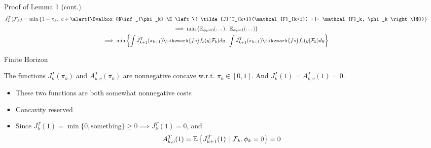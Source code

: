 \documentclass[xcolor={svgnames}]{beamer}
\begin{document}
\begin{frame}{Proof of Lemma 1 (cont.)}
\[
  \begin{gathered}
  \tilde{J}^T_{k}(\mathcal{F}_k) = \min\left\{
  1 - \pi_k,
  ~c + \alert{\Ovalbox{$\inf_{\phi_k}
    \E\left\{
      \tilde{J}^T_{k+1}(\mathcal{F}_{k+1}) ~|~ \mathcal{F}_k, \phi_k
    \right\}$}}
  \right\} \\[3pt]
  \implies
  \min\left\{
    \E_{\phi_k=0}(\dots), ~\E_{\phi_k=1}(\dots)
  \right\} \\
  \implies
  \min\left\{
    \int J^T_{k+1}(\pi_{k+1}) \tikzmark{fc} f_c(y|\mathcal{F}_k) dy,~
    \int J^T_{k+1}(\pi_{k+1}) \tikzmark{fs} f_s(y|\mathcal{F}_k) dy
  \right\}
\end{gathered}
\]
\end{frame}
\begin{frame}{Finite Horizon}
  \begin{lemma}\label{lem2}
    The functions $J^T_{k}(\pi_k)$ and $A^T_{k,c}(\pi_k)$ are nonnegative concave w.r.t. $\pi_k \in [0,1]$. And $J^T_{k}(1) = A^T_{k,c}(1) = 0$.
  \end{lemma}
  \begin{itemize}
    \item These two functions are both somewhat nonnegative costs
    \item Concavity reserved
    \item Since $J^T_{k}(1) = \min\{ 0, \text{something}\} \ge 0 \implies J^T_k(1) = 0$, and
    \[
      A_{k,c}^T(1) = \mathbb{E}{}\left\{J^T_{k+1}(1) ~|~\mathcal{F}_k, \phi_k=0\right\} = 0
    \]
  \end{itemize}
\end{frame}
\end{document}
